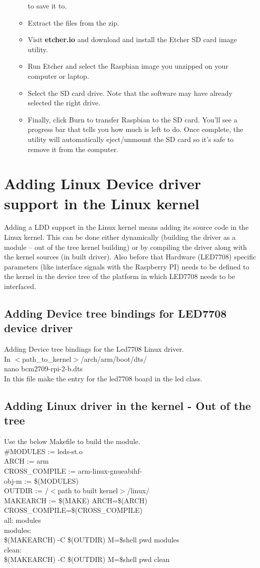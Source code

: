 \begin{enumerate}
\begin{itemize}
		to save it to.
		\item Extract the files from the zip.
		\item Visit \textbf{etcher.io} and download and install the Etcher SD card image utility.
		\item Run Etcher and select the Raspbian image you unzipped on your computer or laptop.
		\item Select the SD card drive. Note that the software may have already selected the right drive.
		\item Finally, click Burn to transfer Raspbian to the SD card. You'll see a progress bar that tells you how
		much is left to do. Once complete, the utility will automatically eject/unmount the SD card so it's safe
		to remove it from the computer.
	\end{itemize}
\end{enumerate}
\section{Adding Linux Device driver support in the Linux kernel}
Adding a LDD support in the Linux kernel means adding its source code in the Linux kernel. This
can be done either dynamically (building the driver as a module – out of the tree kernel
building) or by compiling the driver along with the kernel sources (in built driver). Also before
that Hardware (LED7708) specific parameters (like interface signals with the Raspberry PI)
needs to be defined to the kernel in the device tree of the platform in which LED7708 needs to
be interfaced.
\subsection{Adding Device tree bindings for LED7708 device driver}
Adding Device tree bindings for the Led7708 Linux driver.\\
In $<$path\_to\_kernel$>$/arch/arm/boot/dts/\\
nano bcm2709-rpi-2-b.dts\\
In this file make the entry for the led7708 board in the led class.\\
\subsection{Adding Linux driver in the kernel - Out of the tree}
Use the below Makefile to build the module.\\
\#MODULES := leds-st.o\\
ARCH := arm\\
CROSS\_COMPILE := arm-linux-gnueabihf-\\
obj-m := \$(MODULES)\\
OUTDIR := /$<$path to built kernel$>$/linux/\\
MAKEARCH := \$(MAKE) ARCH=\$(ARCH) CROSS\_COMPILE=\$(CROSS\_COMPILE)\\
all: modules\\
modules:\\
\$(MAKEARCH) -C \$(OUTDIR) M=\${shell pwd} modules\\
clean:\\
\$(MAKEARCH) -C \$(OUTDIR) M=\${shell pwd} clean\\

